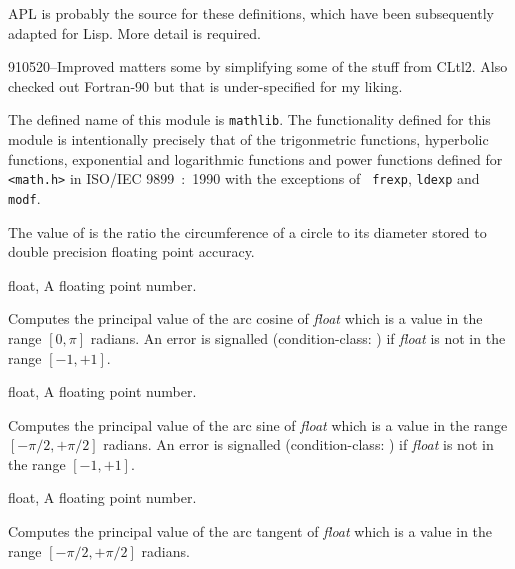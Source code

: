 %
\begin{optPrivate}
APL is probably the source for these definitions, which have been
subsequently adapted for Lisp.  More detail is required.

910520--Improved matters some by simplifying some of the stuff from
CLtl2.  Also checked out Fortran-90 but that is under-specified for my
liking.
\end{optPrivate}
\begin{optDefinition}
The defined name of this module is {\tt mathlib}.  The functionality defined for
this module is intentionally precisely that of the trigonmetric functions,
hyperbolic functions, exponential and logarithmic functions and power functions
defined for {\tt <math.h>} in ISO/IEC 9899~:~1990 with the exceptions of {\tt
    frexp}, {\tt ldexp} and {\tt modf}.

%
\remarks%
The value of  is the ratio the circumference of a circle to its
diameter stored to double precision floating point accuracy.

%
\begin{genericargs}
    \item[float, \classref{float}] A floating point number.
\end{genericargs}
%
\result%
Computes the principal value of the arc cosine of {\em float} which is a value
in the range $[0,\pi]$ radians.  An error is signalled (condition-class:
) if {\em float}
is not in the range $[-1,+1]$.

%
\begin{genericargs}
    \item[float, \classref{float}] A floating point number.
\end{genericargs}
%
\result%
Computes the principal value of the arc sine of {\em float} which is a value in
the range $[-\pi/2,+\pi/2]$ radians.  An error is signalled (condition-class:
) if {\em float}
is not in the range $[-1,+1]$.

%
\begin{genericargs}
    \item[float, \classref{float}] A floating point number.
\end{genericargs}
%
\result%
Computes the principal value of the arc tangent of {\em float}
which is a value in the range $[-\pi/2,+\pi/2]$ radians.


\end{optDefinition}
